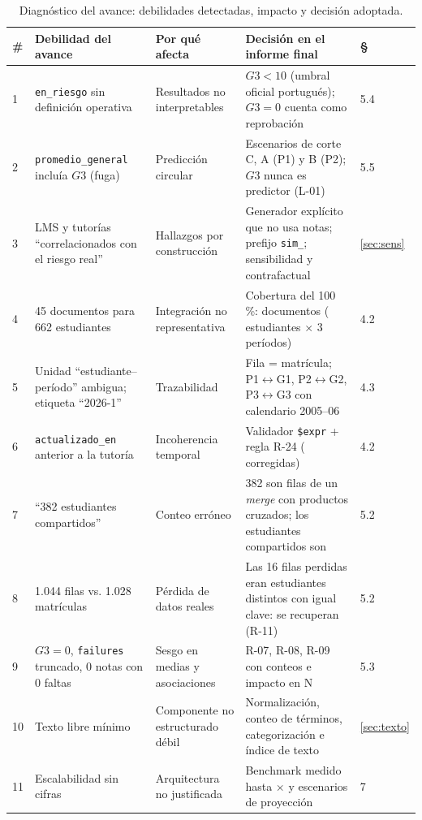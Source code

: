 \documentclass[11pt,a4paper]{article}
\begin{document}
\begin{table}[H]
\centering\scriptsize
\caption{Diagnóstico del avance: debilidades detectadas, impacto y decisión adoptada.}\label{tab:diagnostico}
\begin{tabular}{p{0.3cm}p{4.0cm}p{3.4cm}p{5.9cm}p{0.5cm}}
\toprule
\# & Debilidad del avance & Por qué afecta & Decisión en el informe final & §\\
\midrule
1 & \texttt{en\_riesgo} sin definición operativa & Resultados no interpretables & $G3<10$ (umbral oficial portugués); $G3=0$ cuenta como reprobación & 5.4 \\
2 & \texttt{promedio\_general} incluía $G3$ (fuga) & Predicción circular & Escenarios de corte C, A (P1) y B (P2); $G3$ nunca es predictor (L-01) & 5.5 \\
3 & LMS y tutorías “correlacionados con el riesgo real” & Hallazgos por construcción & Generador explícito que no usa notas; prefijo \texttt{sim\_}; sensibilidad y contrafactual & \ref{sec:sens} \\
4 & 45 documentos para 662 estudiantes & Integración no representativa & Cobertura del 100\,\%: \nDocSeg{} documentos (\nEstCub{} estudiantes $\times$ 3 períodos) & 4.2 \\
5 & Unidad “estudiante–período” ambigua; etiqueta “2026-1” & Trazabilidad & Fila = matrícula; P1$\leftrightarrow$G1, P2$\leftrightarrow$G2, P3$\leftrightarrow$G3 con calendario 2005--06 & 4.3 \\
6 & \texttt{actualizado\_en} anterior a la tutoría & Incoherencia temporal & Validador \texttt{\$expr} + regla R-24 (\reglaRDosCuatro{} corregidas) & 4.2 \\
7 & “382 estudiantes compartidos” & Conteo erróneo & 382 son filas de un \emph{merge} con productos cruzados; los estudiantes compartidos son \nPares{} & 5.2 \\
8 & 1.044 filas vs. 1.028 matrículas & Pérdida de datos reales & Las 16 filas perdidas eran estudiantes distintos con igual clave: se recuperan (R-11) & 5.2 \\
9 & $G3=0$, \texttt{failures} truncado, 0 notas con 0 faltas & Sesgo en medias y asociaciones & R-07, R-08, R-09 con conteos e impacto en N & 5.3 \\
10 & Texto libre mínimo & Componente no estructurado débil & Normalización, conteo de términos, categorización e índice de texto & \ref{sec:texto} \\
11 & Escalabilidad sin cifras & Arquitectura no justificada & Benchmark medido hasta $\times$\benchMaxFactor{} y escenarios de proyección & 7 \\

\end{tabular}
\end{table}
\end{document}

